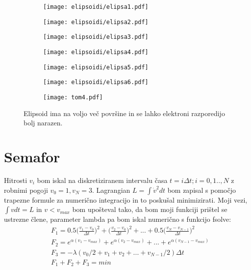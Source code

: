 \documentclass{article}
\begin{document}
\begin{figure}[H]
\centering
\begin{subfigure}{.49\textwidth}
\texttt{[image: elipsoidi/elipsa1.pdf]}
\end{subfigure}
\begin{subfigure}{.49\textwidth}
\texttt{[image: elipsoidi/elipsa2.pdf]}
\end{subfigure}
\end{figure}
\begin{figure}[H]
\centering
\begin{subfigure}{.49\textwidth}
\texttt{[image: elipsoidi/elipsa3.pdf]}
\end{subfigure}
\begin{subfigure}{.49\textwidth}
\texttt{[image: elipsoidi/elipsa4.pdf]}
\end{subfigure}
\end{figure}
\begin{figure}[H]
\centering
\begin{subfigure}{.49\textwidth}
\texttt{[image: elipsoidi/elipsa5.pdf]}
\end{subfigure}
\begin{subfigure}{.49\textwidth}
\texttt{[image: elipsoidi/elipsa6.pdf]}
\end{subfigure}
\end{figure}

\begin{figure}[H]
\centering
\begin{subfigure}{\textwidth}
\texttt{[image: tom4.pdf]}
\end{subfigure}
\caption*{Elipsoid ima na voljo več površine in se lahko elektroni razporedijo bolj narazen.}
\end{figure}

\section{Semafor}

Hitrosti $v_i$ bom iskal na diskretiziranem intervalu časa $t = i\Delta t ; i=0,1..,N$ z robnimi pogoji $v_0=1, v_{N} = 3$.
Lagrangian $L = \int \dot{v}^2 dt$ bom zapisal s pomočjo trapezne formule za numerično integracijo in to poskušal minimizirati.
Moji vezi, $\int v dt = L$ in $v < v_{max}$ bom upošteval tako, da bom moji funkciji prištel se ustrezne člene, parameter lambda pa bom iskal numerično s funkcijo fsolve:
\begin{align*}
&F_1 = 0.5\Big(\frac{v_1 -v_0}{\Delta t}\Big)^2 + \Big(\frac{v_2- v_0}{\Delta t}\Big)^2 + ... + 0.5\Big(\frac{v_N-v_{N-1}}{\Delta t}\Big)^2\\
&F_2 =  e^{\alpha (v_1 - v_{max})} +  e^{\alpha (v_2 - v_{max})} + ... +  e^{\alpha (v_{N-1} - v_{max})} \\
&F_3 = -\lambda (v_0/2 + v_1 + v_2 + ... + v_{N-1}/2)\Delta t \\
&F_1 + F_2 + F_3 = min
\end{align*}
\end{document}
